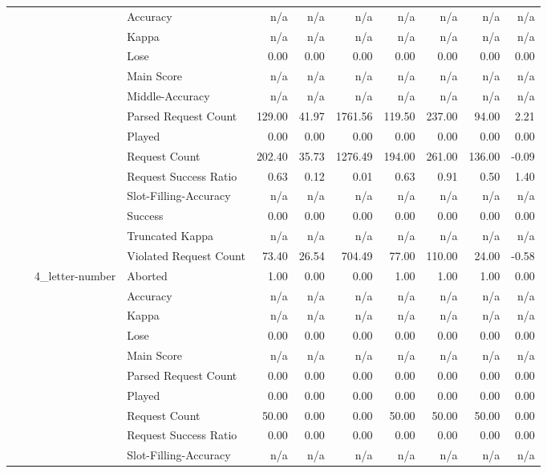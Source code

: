 \begin{tabular}{llllrrrrrrr}
 &  &  & Accuracy & n/a & n/a & n/a & n/a & n/a & n/a & n/a \\
 &  &  & Kappa & n/a & n/a & n/a & n/a & n/a & n/a & n/a \\
 &  &  & Lose & 0.00 & 0.00 & 0.00 & 0.00 & 0.00 & 0.00 & 0.00 \\
 &  &  & Main Score & n/a & n/a & n/a & n/a & n/a & n/a & n/a \\
 &  &  & Middle-Accuracy & n/a & n/a & n/a & n/a & n/a & n/a & n/a \\
 &  &  & Parsed Request Count & 129.00 & 41.97 & 1761.56 & 119.50 & 237.00 & 94.00 & 2.21 \\
 &  &  & Played & 0.00 & 0.00 & 0.00 & 0.00 & 0.00 & 0.00 & 0.00 \\
 &  &  & Request Count & 202.40 & 35.73 & 1276.49 & 194.00 & 261.00 & 136.00 & -0.09 \\
 &  &  & Request Success Ratio & 0.63 & 0.12 & 0.01 & 0.63 & 0.91 & 0.50 & 1.40 \\
 &  &  & Slot-Filling-Accuracy & n/a & n/a & n/a & n/a & n/a & n/a & n/a \\
 &  &  & Success & 0.00 & 0.00 & 0.00 & 0.00 & 0.00 & 0.00 & 0.00 \\
 &  &  & Truncated Kappa & n/a & n/a & n/a & n/a & n/a & n/a & n/a \\
 &  &  & Violated Request Count & 73.40 & 26.54 & 704.49 & 77.00 & 110.00 & 24.00 & -0.58 \\
\cline{3-11}
 &  & \multirow[t]{13}{*}{4_letter-number} & Aborted & 1.00 & 0.00 & 0.00 & 1.00 & 1.00 & 1.00 & 0.00 \\
 &  &  & Accuracy & n/a & n/a & n/a & n/a & n/a & n/a & n/a \\
 &  &  & Kappa & n/a & n/a & n/a & n/a & n/a & n/a & n/a \\
 &  &  & Lose & 0.00 & 0.00 & 0.00 & 0.00 & 0.00 & 0.00 & 0.00 \\
 &  &  & Main Score & n/a & n/a & n/a & n/a & n/a & n/a & n/a \\
 &  &  & Parsed Request Count & 0.00 & 0.00 & 0.00 & 0.00 & 0.00 & 0.00 & 0.00 \\
 &  &  & Played & 0.00 & 0.00 & 0.00 & 0.00 & 0.00 & 0.00 & 0.00 \\
 &  &  & Request Count & 50.00 & 0.00 & 0.00 & 50.00 & 50.00 & 50.00 & 0.00 \\
 &  &  & Request Success Ratio & 0.00 & 0.00 & 0.00 & 0.00 & 0.00 & 0.00 & 0.00 \\
 &  &  & Slot-Filling-Accuracy & n/a & n/a & n/a & n/a & n/a & n/a & n/a \\

\end{tabular}
